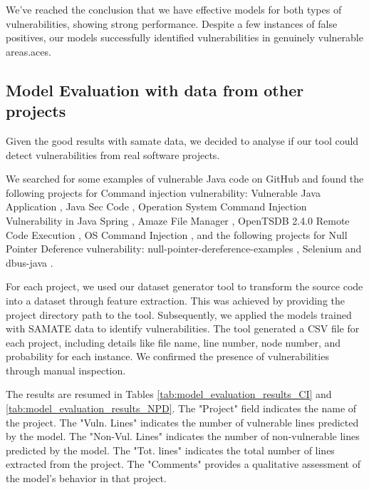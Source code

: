 \documentclass[journal,a4paper]{IEEEtran}
\begin{document}
We've reached the conclusion that we have effective models for both types of vulnerabilities, showing strong performance. Despite a few instances of false positives, our models successfully identified vulnerabilities in genuinely vulnerable areas.aces.

\subsection{Model Evaluation with data from other projects}

Given the good results with samate data, we decided to analyse if our tool could detect vulnerabilities from real software projects.

We searched for some examples of vulnerable Java code on GitHub and found the following projects for Command injection vulnerability: Vulnerable Java Application \cite{github_Christophe}, Java Sec Code \cite{github_Syclover}, Operation System Command Injection Vulnerability in Java Spring \cite{github_Will}, Amaze File Manager \cite{github_Vishal}, OpenTSDB 2.4.0 Remote Code Execution \cite{github_Chris}, OS Command Injection \cite{github_Utku}, and the following projects for Null Pointer Deference vulnerability: null-pointer-dereference-examples \cite{github_Sridhar}, Selenium \cite{github_Harsha} and dbus-java \cite{github_David}.

For each project, we used our dataset generator tool to transform the source code into a dataset through feature extraction. This was achieved by providing the project directory path to the tool. Subsequently, we applied the models trained with SAMATE data to identify vulnerabilities. The tool generated a CSV file for each project, including details like file name, line number, node number, and probability for each instance. We confirmed the presence of vulnerabilities through manual inspection.

The results are resumed in Tables \ref{tab:model_evaluation_results_CI} and \ref{tab:model_evaluation_results_NPD}. The "Project" field indicates the name of the project. The "Vuln. Lines" indicates the number of vulnerable lines predicted by the model. The "Non-Vul. Lines" indicates the number of non-vulnerable lines predicted by the model. The "Tot. lines" indicates the total number of lines extracted from the project. The "Comments" provides a qualitative assessment of the model's behavior in that project. 
\end{document}
